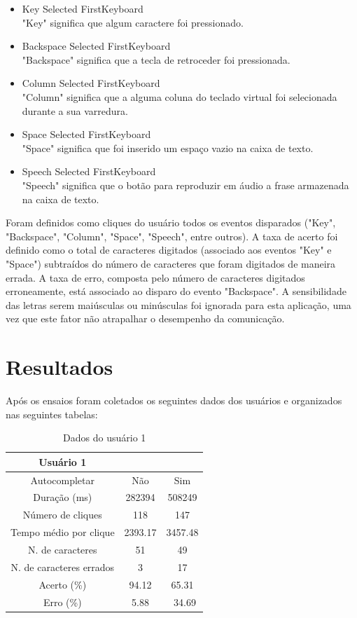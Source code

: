 \documentclass[twoside]{article}
\begin{document}
\begin{multicols}{2}
\begin{itemize}
\item Key Selected FirstKeyboard
\hfill \\
  "Key" significa que algum caractere foi pressionado.
\item Backspace Selected FirstKeyboard
\hfill \\
  "Backspace" significa que a tecla de retroceder foi pressionada.
\item Column Selected FirstKeyboard
\hfill \\
  "Column" significa que a alguma coluna do teclado virtual foi selecionada durante a sua varredura.
\item Space Selected FirstKeyboard
\hfill \\
  "Space" significa que foi inserido um espaço vazio na caixa de texto.
\item Speech Selected FirstKeyboard
\hfill \\
  "Speech" significa que o botão para reproduzir em áudio a frase armazenada na caixa de texto.
\end{itemize}

Foram definidos como cliques do usuário todos os eventos disparados ("Key", "Backspace", "Column", "Space", "Speech", entre outros). A taxa de acerto foi definido como o total de caracteres digitados (associado aos eventos "Key" e "Space") subtraídos do número de caracteres que foram digitados de maneira errada. A taxa de erro, composta pelo número de caracteres digitados erroneamente, está associado ao disparo do evento "Backspace".
A sensibilidade das letras serem maiúsculas ou minúsculas foi ignorada para esta aplicação, uma vez que este fator não atrapalhar o desempenho da comunicação.

\section{Resultados}

Após os ensaios foram coletados os seguintes dados dos usuários e organizados nas seguintes tabelas:

\begin{table}[H]
\caption{Dados do usuário 1}
\centering
\begin{tabular}{ccc}
\toprule
 Usuário 1 &  & \\
\midrule
Autocompletar & Não & Sim\\
Duração (ms) & 282394 & 508249\\
Número de cliques & 118 & 147\\
Tempo médio por clique & 2393.17 & 3457.48\\
N. de caracteres & 51 & 49\\
N. de caracteres errados & 3 & 17\\
Acerto (\%) & 94.12 & 65.31\\
Erro (\%) & 5.88 &\ 34.69\\
\bottomrule
\end{tabular}
\end{table}



\end{multicols}
\end{document}
